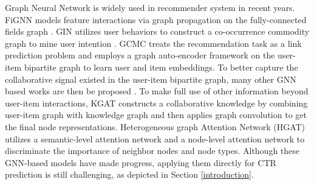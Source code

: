 Graph Neural Network is widely used in recommender system in recent years.
FiGNN models feature interactions via graph propagation on the fully-connected fields graph \cite{li2019fi}.
GIN utilizes user behaviors to construct a co-occurrence commodity graph to mine user intention \cite{li2019graph}.
GCMC \cite{berg2017graph} treats the recommendation task as a link prediction problem and employs a graph auto-encoder framework on the user-item bipartite graph to learn user and item embeddings.
To better capture the collaborative signal existed in the user-item bipartite graph, many other GNN based works are then be proposed \cite{ying2018graph, wang2019neural, he2020lightgcn}.
To make full use of other information beyond user-item interactions, KGAT \cite{wang2019kgat} constructs a collaborative knowledge by combining user-item graph with knowledge graph and then applies graph convolution to get the final node representations. 
Heterogeneous graph Attention Network (HGAT) \cite{linmei2019heterogeneous} utilizes a semantic-level attention network and a node-level attention network to discriminate the importance of neighbor nodes and node types. 
Although these GNN-based models have made progress, applying them directly for CTR prediction is still challenging, as depicted in Section \ref{introduction}.

